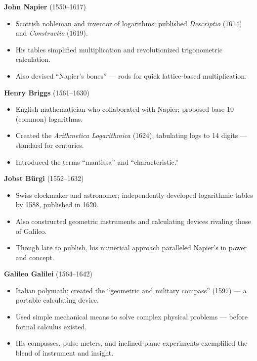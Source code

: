\documentclass[9pt]{article}
\begin{document}
\textbf{John Napier} (1550–1617)

\begin{itemize}
    \item Scottish nobleman and inventor of logarithms; published \textit{Descriptio} (1614) and \textit{Constructio} (1619).
    \item His tables simplified multiplication and revolutionized trigonometric calculation.
    \item Also devised “Napier’s bones” — rods for quick lattice-based multiplication.
\end{itemize}

\textbf{Henry Briggs} (1561–1630)

\begin{itemize}
    \item English mathematician who collaborated with Napier; proposed base-10 (common) logarithms.
    \item Created the \textit{Arithmetica Logarithmica} (1624), tabulating logs to 14 digits — standard for centuries.
    \item Introduced the terms “mantissa” and “characteristic.”
\end{itemize}

\textbf{Jobst Bürgi} (1552–1632)

\begin{itemize}
    \item Swiss clockmaker and astronomer; independently developed logarithmic tables by 1588, published in 1620.
    \item Also constructed geometric instruments and calculating devices rivaling those of Galileo.
    \item Though late to publish, his numerical approach paralleled Napier’s in power and concept.
\end{itemize}

\textbf{Galileo Galilei} (1564–1642)

\begin{itemize}
    \item Italian polymath; created the “geometric and military compass” (1597) — a portable calculating device.
    \item Used simple mechanical means to solve complex physical problems — before formal calculus existed.
    \item His compasses, pulse meters, and inclined-plane experiments exemplified the blend of instrument and insight.
\end{itemize}
\end{document}
